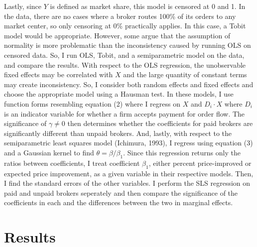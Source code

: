 \documentclass[12pt,a4paper]{article}
\begin{document}
	Lastly, since $Y$  is defined as market share, this model is censored at 0 and 1. In the data, there are no cases where a broker routes 100\% of its orders to any market center, so only censoring at 0\% practically applies. In this case, a Tobit model would be appropriate. However, some argue that the assumption of normality is more problematic than the inconsistency caused by running OLS on censored data. So, I run OLS, Tobit, and a semiparametric model on the data, and compare the results. With respect to the OLS regression, the unobservable fixed effects may be correlated with $X$ and the large quantity of constant terms may create inconsistency. So, I consider both random effects and fixed effects and choose the appropriate model using a Hausman test. In these models, I use function forms resembling equation (2) where I regress on $X$ and $D_i \cdot X$ where $D_i$ is an indicator variable for whether a firm accepts payment for order flow. The significance of $\gamma \neq 0$ then determines whether the coefficients for paid brokers are significantly different than unpaid brokers. And, lastly, with respect to the semiparametric least squares model (Ichimura, 1993), I regress using equation (3) and a Gaussian kernel to find $\theta = \beta / \beta_1$. Since this regression returns only the ratios between coefficients, I treat coefficient $\beta_1$, either percent price-improved or expected price improvement, as a given variable in their respective models. Then, I find the standard errors of the other variables. I perform the SLS regression on paid and unpaid brokers seperately and then compare the significance of the coefficients in each and the differences between the two in marginal effects.
	
	


	
\section{Results}
\end{document}
